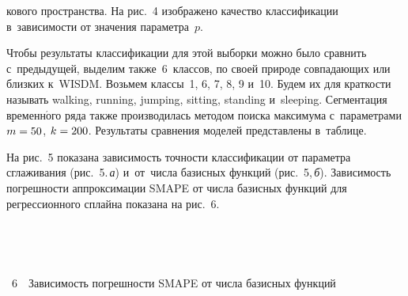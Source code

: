 \begin{multicols}{2}
\vspace*{8pt}

\addtocounter{figure}{1}

\noindent
кового 
пространства. На рис.~4 изображено качество 
классификации в~зависимости от значения параметра~$p$.




Чтобы результаты классификации для этой выборки можно было сравнить с~предыдущей, 
выделим  также~6~классов, по своей природе совпа\-да\-ющих или близких к~WISDM. 
Возьмем классы~1, 6, 7, 8, 9 и~10. Будем их для краткости называть walking, 
running, jumping, sitting, standing и~sleeping. Сегментация временн$\acute{\mbox{о}}$го 
ряда также производилась методом поиска максимума с~параметрами
$m\hm=50$, $k\hm=200$. Результаты сравнения моделей представлены в~таблице.


На рис.~5 показана зависимость точ\-ности 
классификации от па\-ра\-мет\-ра сглаживания (рис.~5.\,\textit{а})
и~от~чис\-ла базисных функ\-ций (рис.~5,\,\textit{б}).
Зависимость погрешности аппроксимации SMAPE от чис\-ла базисных функций для 
регрессионного сплайна показана на рис.~6.


\setcounter{figure}{4}
\begin{figure*} %
\vspace*{1pt}
 \begin{center}  
  \mbox{%
 \epsfxsize=162.555mm 
 }
\end{center}
\vspace*{-13pt}
    \label{ris:sm2}
    \vspace*{-6pt}
\end{figure*}




{ \begin{center}  %
 \vspace*{-6pt}
  \mbox{%
 \epsfxsize=78.603mm 
 }


\end{center}


\noindent
{{\figurename~6}\ \ \small{Зависимость погрешности SMAPE от числа базисных функций}}
}


\addtocounter{figure}{1}

\vspace*{-9pt}


\end{multicols}
